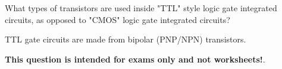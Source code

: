 

What types of transistors are used inside "TTL" style logic gate integrated circuits, as opposed to "CMOS" logic gate integrated circuits?







TTL gate circuits are made from bipolar (PNP/NPN) transistors.







{\bf This question is intended for exams only and not worksheets!}.



